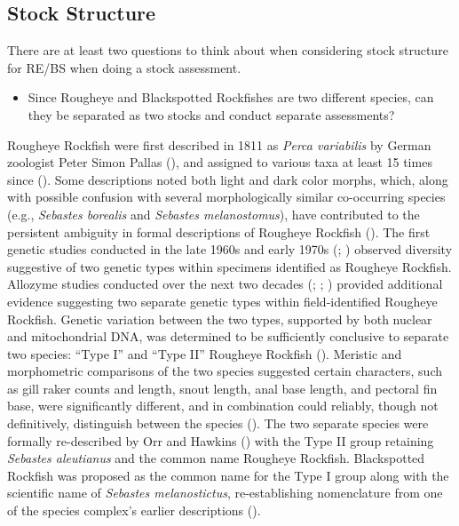 \documentclass[
  english,
]{article}
\providecommand{\tightlist}{%
  \setlength{\itemsep}{0pt}\setlength{\parskip}{0pt}}
\begin{document}
\subsection{Stock Structure}\label{sec-stock_structure}

There are at least two questions to think about when considering stock
structure for RE/BS when doing a stock assessment.

\begin{itemize}
\tightlist
\item
  Since Rougheye and Blackspotted Rockfishes are two different species,
  can they be separated as two stocks and conduct separate assessments?
\end{itemize}

Rougheye Rockfish were first described in 1811 as \emph{Perca
variabilis} by German zoologist Peter Simon Pallas
(), and
assigned to various taxa at least 15 times since
(). Some
descriptions noted both light and dark color morphs, which, along with
possible confusion with several morphologically similar co-occurring
species (e.g., \emph{Sebastes borealis} and \emph{Sebastes
melanostomus}), have contributed to the persistent ambiguity in formal
descriptions of Rougheye Rockfish (). The first genetic studies conducted in the late
1960s and early 1970s (; ) observed diversity suggestive of two genetic types within
specimens identified as Rougheye Rockfish. Allozyme studies conducted
over the next two decades (; ;
) provided
additional evidence suggesting two separate genetic types within
field-identified Rougheye Rockfish. Genetic variation between the two
types, supported by both nuclear and mitochondrial DNA, was determined
to be sufficiently conclusive to separate two species: ``Type I'' and
``Type II'' Rougheye Rockfish (). Meristic and morphometric comparisons of the two species
suggested certain characters, such as gill raker counts and length,
snout length, anal base length, and pectoral fin base, were
significantly different, and in combination could reliably, though not
definitively, distinguish between the species
(). The
two separate species were formally re-described by Orr and Hawkins
() with the Type II group retaining
\emph{Sebastes aleutianus} and the common name Rougheye Rockfish.
Blackspotted Rockfish was proposed as the common name for the Type I
group along with the scientific name of \emph{Sebastes melanostictus},
re-establishing nomenclature from one of the species complex's earlier
descriptions ().
\end{document}

